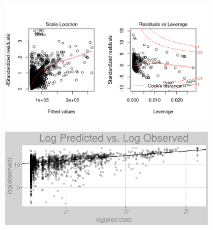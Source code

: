 \begin{figure}[h]
\centering
\begin{subfigure}{1\textwidth}
\centering
\includegraphics[width=.99\textwidth, height=0.425\textheight]{Images/natural_gas_psf_rfe_res_2.png}
\end{subfigure}
\begin{subfigure}{1\textwidth}
\centering
\includegraphics[width=.99\textwidth, height=0.475\textheight]{Images/natural_gas_psf_rfe_pvo.png}
\end{subfigure}
\end{figure}
\FloatBarrier
\newpage
